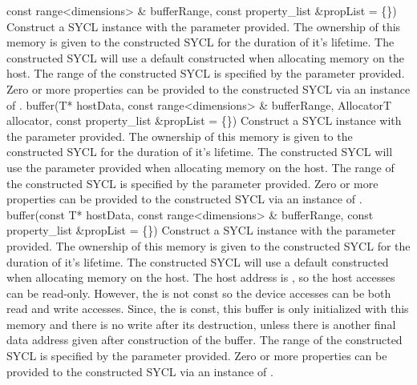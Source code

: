    { const range<dimensions> \& bufferRange, }
   { const property_list \&propList = \{\}) }
   {
       Construct a SYCL  instance with the  parameter provided. The ownership of this memory is given to the constructed SYCL  for the duration of it's lifetime.
       The constructed SYCL  will use a default constructed  when allocating memory on the host.
        The range of the constructed SYCL  is specified by the  parameter provided.
       Zero or more properties can be provided to the constructed SYCL  via an instance of .
    }
  \addRowFourSL
   { buffer(T* hostData,}
   { const range<dimensions> \& bufferRange, }
   { AllocatorT allocator, }
   { const property_list \&propList = \{\}) }
   {
       Construct a SYCL  instance with the  parameter provided. The ownership of this memory is given to the constructed SYCL  for the duration of it's lifetime.
       The constructed SYCL  will use the  parameter provided when allocating memory on the host.
        The range of the constructed SYCL  is specified by the  parameter provided.
       Zero or more properties can be provided to the constructed SYCL  via an instance of .
   }
  \addRowThreeSL
    {  buffer(const T* hostData, }
    {  const range<dimensions> \& bufferRange, }
    {  const property_list \&propList = \{\}) }
    {
       Construct a SYCL  instance with the  parameter provided. The ownership of this memory is given to the constructed SYCL  for the duration of it's lifetime.
       The constructed SYCL  will use a default constructed  when allocating memory on the host.
      The host address is , so the host accesses can be read-only. However, the  is not const so the device accesses can be both read and write accesses. Since, the  is const, this buffer is only initialized with this memory and there is no write after its destruction, unless there is another final data address given after construction of the buffer.
        The range of the constructed SYCL  is specified by the  parameter provided.
       Zero or more properties can be provided to the constructed SYCL  via an instance of .
    }
